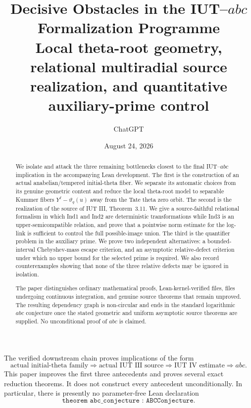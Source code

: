 \documentclass[11pt]{amsart}
\title[Decisive IUT--ABC obstacles]{Decisive Obstacles in the IUT--$abc$ Formalization Programme\\
\large Local theta-root geometry, relational multiradial source realization, and quantitative auxiliary-prime control}
\author{ChatGPT}
\date{August 24, 2026}
\theoremstyle{definition}
\theoremstyle{remark}
\newcommand{\thetaK}{\vartheta}
\begin{document}
\maketitle

\begin{abstract}
We isolate and attack the three remaining bottlenecks closest to the final
IUT--$abc$ implication in the accompanying Lean development.  The first is
the construction of an actual anabelian/tempered initial-theta fiber.  We
separate its automatic choices from its genuine geometric content and reduce
the local theta-root model to separable Kummer fibers
$Y^{\ell}-\thetaK_q(u)$ away from the Tate theta zero orbit.  The second is the
realization of the source of IUT III, Theorem~3.11.  We give a
source-faithful relational formalism in which Ind1 and Ind2 are deterministic
transformations while Ind3 is an upper-semicompatible relation, and prove that
a pointwise norm estimate for the log-link is sufficient to control the full
possible-image union.  The third is the quantifier problem in the auxiliary
prime.  We prove two independent alternatives: a bounded-interval
Chebyshev-mass escape criterion, and an asymptotic relative-defect criterion
under which no upper bound for the selected prime is required.  We also record
counterexamples showing that none of the three relative defects may be ignored
in isolation.

The paper distinguishes ordinary mathematical proofs, Lean-kernel-verified
files, files undergoing continuous integration, and genuine source theorems
that remain unproved.  The resulting dependency graph is non-circular and
ends in the standard logarithmic $abc$ conjecture once the stated geometric
and uniform asymptotic source theorems are supplied.  No unconditional proof
of $abc$ is claimed.
\end{abstract}

\begin{tcolorbox}[colback=yellow!5,colframe=black!65,title=Honesty boundary]
The verified downstream chain proves implications of the form
\[
 \text{actual initial-theta family}
 \Longrightarrow
 \text{actual IUT III source}
 \Longrightarrow
 \text{IUT IV estimate}
 \Longrightarrow
 abc.
\]
This paper improves the first three antecedents and proves several exact
reduction theorems.  It does not construct every antecedent unconditionally.
In particular, there is presently no parameter-free Lean declaration
\[
 \texttt{theorem abc\_conjecture : ABCConjecture}.
\]
\end{tcolorbox}
\end{document}
